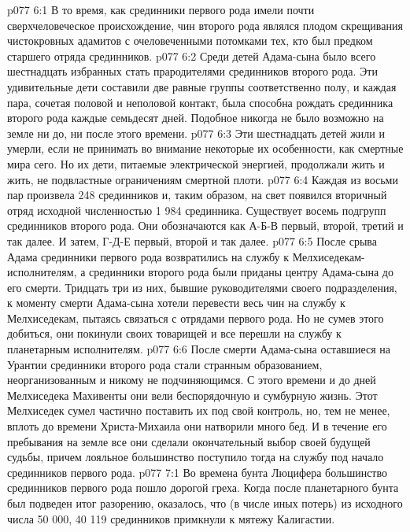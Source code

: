 \vs p077 6:1 В то время, как срединники первого рода имели почти сверхчеловеческое происхождение, чин второго рода являлся плодом скрещивания чистокровных адамитов с очеловеченными потомками тех, кто был предком старшего отряда срединников.
\vs p077 6:2 Среди детей Адама\hyp{}сына было всего шестнадцать избранных стать прародителями срединников второго рода. Эти удивительные дети составили две равные группы соответственно полу, и каждая пара, сочетая половой и неполовой контакт, была способна рождать срединника второго рода каждые семьдесят дней. Подобное никогда не было возможно на земле ни до, ни после этого времени.
\vs p077 6:3 Эти шестнадцать детей жили и умерли, если не принимать во внимание некоторые их особенности, как смертные мира сего. Но их дети, питаемые электрической энергией, продолжали жить и жить, не подвластные ограничениям смертной плоти.
\vs p077 6:4 Каждая из восьми пар произвела 248 срединников и, таким образом, на свет появился вторичный отряд исходной численностью 1 984 срединника. Существует восемь подгрупп срединников второго рода. Они обозначаются как А\hyp{}Б\hyp{}В первый, второй, третий и так далее. И затем, Г\hyp{}Д\hyp{}Е первый, второй и так далее.
\vs p077 6:5 \pc После срыва Адама срединники первого рода возвратились на службу к Мелхиседекам\hyp{}исполнителям, а срединники второго рода были приданы центру Адама\hyp{}сына до его смерти. Тридцать три из них, бывшие руководителями своего подразделения, к моменту смерти Адама\hyp{}сына хотели перевести весь чин на службу к Мелхиседекам, пытаясь связаться с отрядами первого рода. Но не сумев этого добиться, они покинули своих товарищей и все перешли на службу к планетарным исполнителям.
\vs p077 6:6 После смерти Адама\hyp{}сына оставшиеся на Урантии срединники второго рода стали странным образованием, неорганизованным и никому не подчиняющимся. С этого времени и до дней Мелхиседека Махивенты они вели беспорядочную и сумбурную жизнь. Этот Мелхиседек сумел частично поставить их под свой контроль, но, тем не менее, вплоть до времени Христа\hyp{}Михаила они натворили много бед. И в течение его пребывания на земле все они сделали окончательный выбор своей будущей судьбы, причем лояльное большинство поступило тогда на службу под начало срединников первого рода.
\vs p077 7:1 Во времена бунта Люцифера большинство срединников первого рода пошло дорогой греха. Когда после планетарного бунта был подведен итог разорению, оказалось, что (в числе иных потерь) из исходного числа 50 000, 40 119 срединников примкнули к мятежу Калигастии.
